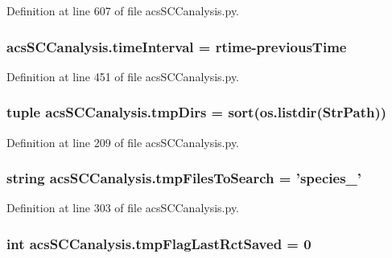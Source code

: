 Definition at line 607 of file acs\-S\-C\-Canalysis.\-py.

\hypertarget{a00102_a7d0f86310c439e970e0b41121364027c}{
\subsubsection[{time\-Interval}]{\setlength{\rightskip}{0pt plus 5cm}acs\-S\-C\-Canalysis.\-time\-Interval = {\bf rtime}-\/{\bf previous\-Time}}}\label{a00102_a7d0f86310c439e970e0b41121364027c}


Definition at line 451 of file acs\-S\-C\-Canalysis.\-py.

\hypertarget{a00102_ace4c571efd2e5ecd266ce5701f761a83}{
\subsubsection[{tmp\-Dirs}]{\setlength{\rightskip}{0pt plus 5cm}tuple acs\-S\-C\-Canalysis.\-tmp\-Dirs = sort(os.\-listdir({\bf Str\-Path}))}}\label{a00102_ace4c571efd2e5ecd266ce5701f761a83}


Definition at line 209 of file acs\-S\-C\-Canalysis.\-py.

\hypertarget{a00102_a141356fc914110fdf3ec4f0fc3beaab5}{
\subsubsection[{tmp\-Files\-To\-Search}]{\setlength{\rightskip}{0pt plus 5cm}string acs\-S\-C\-Canalysis.\-tmp\-Files\-To\-Search = 'species\-\_\-'}}\label{a00102_a141356fc914110fdf3ec4f0fc3beaab5}


Definition at line 303 of file acs\-S\-C\-Canalysis.\-py.

\hypertarget{a00102_a6e8aff976901d1424dd1ff00c3387014}{
\subsubsection[{tmp\-Flag\-Last\-Rct\-Saved}]{\setlength{\rightskip}{0pt plus 5cm}int acs\-S\-C\-Canalysis.\-tmp\-Flag\-Last\-Rct\-Saved = 0}}\label{a00102_a6e8aff976901d1424dd1ff00c3387014}


